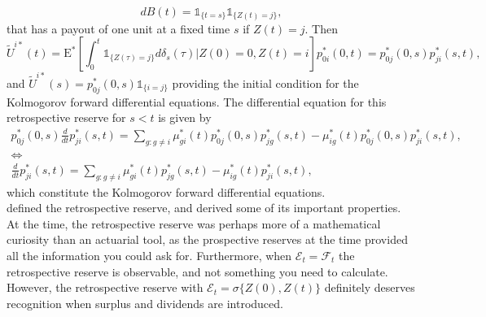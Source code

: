 \documentclass[12pt]{article}
\newcommand{\E}{\text{E}}
\newcommand{\indic}[1]{\mathds{1}_{ \{ #1 \} }}
\theoremstyle{my_thm}
\theoremstyle{my_rem}
\begin{document}
$$
dB(t)=\indic{t=s}\indic{Z(t)=j},
$$
that has a payout of one unit at a fixed time $s$ if $Z(t)=j$. Then 
$$
\tilde{U}^{i*}(t)=\E^* \left[ \int_0^t  \indic{Z(\tau)=j} d\delta_{s}(\tau) |Z(0)=0, Z(t)=i \right] p^*_{0i}(0,t) = p^*_{0j}(0,s)p^*_{ji}(s,t),
$$
and $\tilde{U}^{i*}(s)=p^*_{0j}(0,s)\indic{i=j}$ providing the initial condition for the Kolmogorov forward differential equations. The differential equation for this retrospective reserve for $s<t$ is given by 
\begin{gather*}
p^*_{0j}(0,s)\frac{d}{dt}p^*_{ji}(s,t)= \sum_{g:g\neq i} \mu^*_{gi}(t)p^*_{0j}(0,s)p^*_{jg}(s,t)- \mu^*_{ig}(t)p^*_{0j}(0,s)p^*_{ji}(s,t),
\\
\Leftrightarrow
\\
\frac{d}{dt}p^*_{ji}(s,t)= \sum_{g:g\neq i} \mu^*_{gi}(t)p^*_{jg}(s,t)- \mu^*_{ig}(t)p^*_{ji}(s,t),
\end{gather*}
which constitute the Kolmogorov forward differential equations. 
\\[12pt]
\citet{Norberg} defined the retrospective reserve, and derived some of its important properties. At the time, the retrospective reserve was perhaps more of a mathematical curiosity than an actuarial tool, as the prospective reserves at the time provided all the information you could ask for. Furthermore, when $\mathcal{E}_t=\mathcal{F}_t$ the retrospective reserve is observable, and not something you need to calculate. However, the retrospective reserve with $\mathcal{E}_t=\sigma \{Z(0),Z(t)\}$ definitely deserves recognition when surplus and dividends are introduced.
\end{document}

